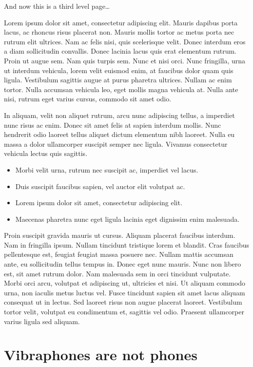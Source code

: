 \documentclass[11pt,oneside,openany]{book}
\begin{document}
And now this is a third level page\ldots{}

Lorem ipsum dolor sit amet, consectetur adipiscing elit. Mauris dapibus porta lacus, ac rhoncus risus placerat non. Mauris mollis tortor ac metus porta nec rutrum elit ultrices. Nam ac felis nisi, quis scelerisque velit. Donec interdum eros a diam sollicitudin convallis. Donec lacinia lacus quis erat elementum rutrum. Proin ut augue sem. Nam quis turpis sem. Nunc et nisi orci. Nunc fringilla, urna ut interdum vehicula, lorem velit euismod enim, at faucibus dolor quam quis ligula. Vestibulum sagittis augue at purus pharetra ultrices. Nullam ac enim tortor. Nulla accumsan vehicula leo, eget mollis magna vehicula at. Nulla ante nisi, rutrum eget varius cursus, commodo sit amet odio.

In aliquam, velit non aliquet rutrum, arcu nunc adipiscing tellus, a imperdiet nunc risus ac enim. Donec sit amet felis at sapien interdum mollis. Nunc hendrerit odio laoreet tellus aliquet dictum elementum nibh laoreet. Nulla eu massa a dolor ullamcorper suscipit semper nec ligula. Vivamus consectetur vehicula lectus quis sagittis.

\begin{itemize}
\item Morbi velit urna, rutrum nec suscipit ac, imperdiet vel lacus.
\item Duis suscipit faucibus sapien, vel auctor elit volutpat ac.
\item Lorem ipsum dolor sit amet, consectetur adipiscing elit.
\item Maecenas pharetra nunc eget ligula lacinia eget dignissim enim malesuada.
\end{itemize}

Proin suscipit gravida mauris ut cursus. Aliquam placerat faucibus interdum. Nam in fringilla ipsum. Nullam tincidunt tristique lorem et blandit. Cras faucibus pellentesque est, feugiat feugiat massa posuere nec. Nullam mattis accumsan ante, eu sollicitudin tellus tempus in. Donec eget nunc mauris. Nunc non libero est, sit amet rutrum dolor. Nam malesuada sem in orci tincidunt vulputate. Morbi orci arcu, volutpat et adipiscing ut, ultricies et nisi. Ut aliquam commodo urna, non iaculis metus luctus vel. Fusce tincidunt sapien sit amet lacus aliquam consequat ut in lectus. Sed laoreet risus non augue placerat laoreet. Vestibulum tortor velit, volutpat eu condimentum et, sagittis vel odio. Praesent ullamcorper varius ligula sed aliquam.

\chapter{Vibraphones are not phones}\hypertarget{vibraphones-are-not-phones}{}\label{vibraphones-are-not-phones}
\end{document}
